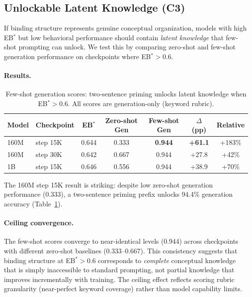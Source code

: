 \documentclass[10pt]{article} %
\begin{document}
\subsection{Unlockable Latent Knowledge (C3)}\label{sec:c3}

If binding structure represents genuine conceptual organization, models with high EB$^*$ but low behavioral performance should contain \emph{latent knowledge} that few-shot prompting can unlock.
We test this by comparing zero-shot and few-shot generation performance on checkpoints where EB$^*>0.6$.

\paragraph{Results.}\mbox{}

\begin{table}[h]
\centering
\begin{tabular}{|l|l|c|c|c|c|c|}
\hline
\textbf{Model} & \textbf{Checkpoint} & \textbf{EB$^*$} & \textbf{Zero-shot Gen} & \textbf{Few-shot Gen} & \textbf{$\Delta$ (pp)} & \textbf{Relative} \\
\hline
160M & step 15K & 0.644 & 0.333 & \textbf{0.944} & \textbf{+61.1} & +183\% \\
160M & step 30K & 0.642 & 0.667 & 0.944 & +27.8 & +42\% \\
1B & step 15K & 0.646 & 0.556 & 0.944 & +38.9 & +70\% \\
\hline
\end{tabular}
\caption{Few-shot generation scores: two-sentence priming unlocks latent knowledge when EB$^*>0.6$. All scores are generation-only (keyword rubric).}
\label{tab:c3_pilot_unlock}
\end{table}

The 160M step 15K result is striking: despite low zero-shot generation performance (0.333), a two-sentence priming prefix unlocks 94.4\% generation accuracy (Table~\ref{tab:c3_pilot_unlock}).

\paragraph{Ceiling convergence.}
The few-shot scores converge to near-identical levels (0.944) across checkpoints with different zero-shot baselines (0.333--0.667).
This consistency suggests that binding structure at EB$^*>0.6$ corresponds to \emph{complete} conceptual knowledge that is simply inaccessible to standard prompting, not partial knowledge that improves incrementally with training.
The ceiling effect reflects scoring rubric granularity (near-perfect keyword coverage) rather than model capability limits.
\end{document}
